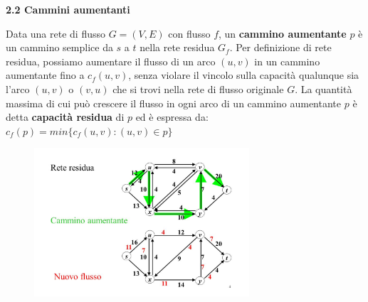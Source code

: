 \documentclass{article}
\begin{document}
\hfill
\begin{flushleft}
\begin{Large} \textbf{2.2 Cammini aumentanti} \end{Large}
\newline
\newline
Data una rete di flusso $G = (V, E)$ con flusso $f$, un \textbf{cammino aumentante} $p$ è un cammino semplice da $s$ a $t$ nella rete residua $G_f$. Per definizione di rete residua, possiamo aumentare il flusso di un arco $(u, v)$ in un cammino aumentante fino a $c_f(u, v)$, senza violare il vincolo sulla capacità qualunque sia l'arco $(u, v)$ o $(v, u)$ che si trovi nella rete di flusso originale $G$.
\newline
La quantità massima di cui può crescere il flusso in ogni arco di un cammino aumentante $p$ è detta \textbf{capacità residua} di $p$ ed è espressa da:
\newline
\newline
$c_f(p) = min \{c_f(u, v): (u, v) \in p \}$
\end{flushleft}
\begin{figure}[ht!]
\begin{center}
  \includegraphics[width=8cm]{rete.jpg}\\
\end{center}
\end{figure}
\hfill
\end{document}
